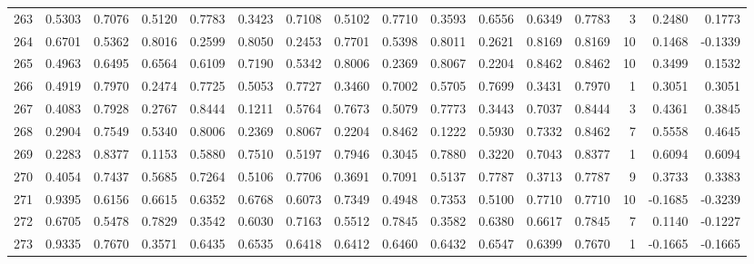 \begin{tabular}{lrrrrrrrrrrrrrrr}
263 &      0.5303 &  0.7076 &  0.5120 &  0.7783 &  0.3423 &  0.7108 &  0.5102 &  0.7710 &  0.3593 &  0.6556 &   0.6349 &     0.7783 &      3 &                    0.2480 &                     0.1773 \\
264 &      0.6701 &  0.5362 &  0.8016 &  0.2599 &  0.8050 &  0.2453 &  0.7701 &  0.5398 &  0.8011 &  0.2621 &   0.8169 &     0.8169 &     10 &                    0.1468 &                    -0.1339 \\
265 &      0.4963 &  0.6495 &  0.6564 &  0.6109 &  0.7190 &  0.5342 &  0.8006 &  0.2369 &  0.8067 &  0.2204 &   0.8462 &     0.8462 &     10 &                    0.3499 &                     0.1532 \\
266 &      0.4919 &  0.7970 &  0.2474 &  0.7725 &  0.5053 &  0.7727 &  0.3460 &  0.7002 &  0.5705 &  0.7699 &   0.3431 &     0.7970 &      1 &                    0.3051 &                     0.3051 \\
267 &      0.4083 &  0.7928 &  0.2767 &  0.8444 &  0.1211 &  0.5764 &  0.7673 &  0.5079 &  0.7773 &  0.3443 &   0.7037 &     0.8444 &      3 &                    0.4361 &                     0.3845 \\
268 &      0.2904 &  0.7549 &  0.5340 &  0.8006 &  0.2369 &  0.8067 &  0.2204 &  0.8462 &  0.1222 &  0.5930 &   0.7332 &     0.8462 &      7 &                    0.5558 &                     0.4645 \\
269 &      0.2283 &  0.8377 &  0.1153 &  0.5880 &  0.7510 &  0.5197 &  0.7946 &  0.3045 &  0.7880 &  0.3220 &   0.7043 &     0.8377 &      1 &                    0.6094 &                     0.6094 \\
270 &      0.4054 &  0.7437 &  0.5685 &  0.7264 &  0.5106 &  0.7706 &  0.3691 &  0.7091 &  0.5137 &  0.7787 &   0.3713 &     0.7787 &      9 &                    0.3733 &                     0.3383 \\
271 &      0.9395 &  0.6156 &  0.6615 &  0.6352 &  0.6768 &  0.6073 &  0.7349 &  0.4948 &  0.7353 &  0.5100 &   0.7710 &     0.7710 &     10 &                   -0.1685 &                    -0.3239 \\
272 &      0.6705 &  0.5478 &  0.7829 &  0.3542 &  0.6030 &  0.7163 &  0.5512 &  0.7845 &  0.3582 &  0.6380 &   0.6617 &     0.7845 &      7 &                    0.1140 &                    -0.1227 \\
273 &      0.9335 &  0.7670 &  0.3571 &  0.6435 &  0.6535 &  0.6418 &  0.6412 &  0.6460 &  0.6432 &  0.6547 &   0.6399 &     0.7670 &      1 &                   -0.1665 &                    -0.1665 \\

\end{tabular}
